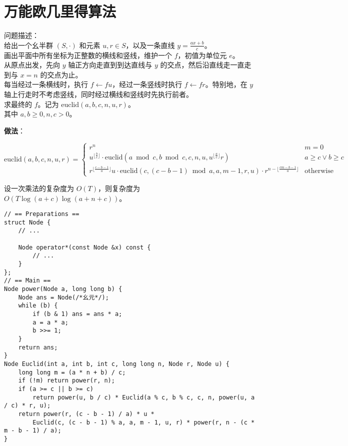 \section{万能欧几里得算法}

\begin{tcolorbox}
问题描述：\\
给出一个幺半群 $(S, \cdot)$ 和元素 $u, r \in S$，以及一条直线 $y = \frac{a x + b}{c}$。\\
画出平面中所有坐标为正整数的横线和竖线，维护一个 $f$，初值为单位元 $e$。\\
从原点出发，先向 $y$ 轴正方向走直到到达直线与 $y$ 的交点，然后沿直线走一直走到与 $x = n$ 的交点为止。\\
每当经过一条横线时，执行 $f \gets fu$，经过一条竖线时执行 $f \gets fr$。特别地，在 $y$ 轴上行走时不考虑竖线，同时经过横线和竖线时先执行前者。\\
求最终的 $f$。记为 $\mathrm{euclid}(a, b, c, n, u, r)$。\\
其中 $a, b \ge 0, n, c > 0$。
\end{tcolorbox}

\textbf{做法}：

$$
\mathrm{euclid}(a, b, c, n, u, r) =
\begin{cases}
r ^ n & m = 0 \\
u ^ {\lfloor\frac{b}{c}\rfloor} \cdot \mathrm{euclid}(a \bmod c, b \bmod c, c, n, u, u ^ {\lfloor\frac{a}{c}\rfloor} r) & a \ge c \lor b \ge c \\
r ^ {\lfloor\frac{c - b - 1}{a}\rfloor} u \cdot \mathrm{euclid}(c, (c - b - 1) \bmod a, a, m - 1, r, u) \cdot r ^ {n - \lfloor\frac{c m - b - 1}{a}\rfloor} & \text{otherwise}
\end{cases}
$$

设一次乘法的复杂度为 $O(T)$，则复杂度为 $O(T \log(a + c) \log(a + n + c))$。

\begin{verbatim}
// == Preparations ==
struct Node {
    // ...

    Node operator*(const Node &x) const {
        // ...
    }
};
// == Main ==
Node power(Node a, long long b) {
    Node ans = Node(/*幺元*/);
    while (b) {
        if (b & 1) ans = ans * a;
        a = a * a;
        b >>= 1;
    }
    return ans;
}
Node Euclid(int a, int b, int c, long long n, Node r, Node u) {
    long long m = (a * n + b) / c;
    if (!m) return power(r, n);
    if (a >= c || b >= c)
        return power(u, b / c) * Euclid(a % c, b % c, c, n, power(u, a / c) * r, u);
    return power(r, (c - b - 1) / a) * u *
        Euclid(c, (c - b - 1) % a, a, m - 1, u, r) * power(r, n - (c * m - b - 1) / a);
}
\end{verbatim}